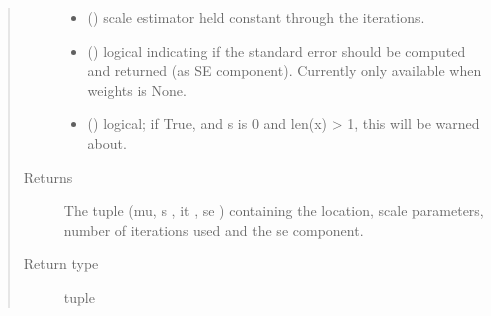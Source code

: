 \documentclass[letterpaper,10pt,english]{sphinxmanual}
\begin{document}
\begin{fulllineitems}
\begin{quote}
\begin{description}
\begin{itemize}
\item {} 
 () \textendash{} scale estimator held constant through the iterations.

\item {} 
 () \textendash{} logical indicating if the standard error should be computed and returned (as SE component). Currently only available when weights is None.

\item {} 
 () \textendash{} logical; if True, and s is 0 and len(x) \textgreater{} 1, this will be warned about.

\end{itemize}

\item[{Returns}] \leavevmode
The tuple (mu, s , it , se ) containing the location, scale parameters, number of iterations used and the se component.

\item[{Return type}] \leavevmode
tuple

\end{description}\end{quote}

\end{fulllineitems}

\end{document}
